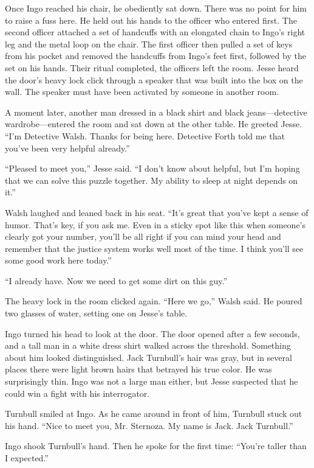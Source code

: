 \documentclass[12pt]{book}
\begin{document}
Once Ingo reached his chair, he obediently sat down.  There was no point for him to raise a fuss here.  He held out his hands to the officer who entered first.  The second officer attached a set of handcuffs with an elongated chain to Ingo's right leg and the metal loop on the chair.  The first officer then pulled a set of keys from his pocket and removed the handcuffs from Ingo's feet first, followed by the set on his hands.  Their ritual completed, the officers left the room.  Jesse heard the door's heavy lock click through a speaker that was built into the box on the wall.  The speaker must have been activated by someone in another room.

A moment later, another man dressed in a black shirt and black jeans---detective wardrobe---entered the room and sat down at the other table.  He greeted Jesse.  ``I'm Detective Walsh.  Thanks for being here.  Detective Forth told me that you've been very helpful already.''

``Pleased to meet you,'' Jesse said.  ``I don't know about helpful, but I'm hoping that we can solve this puzzle together.  My ability to sleep at night depends on it.''

Walsh laughed and leaned back in his seat.  ``It's great that you've kept a sense of humor.  That's key, if you ask me.  Even in a sticky spot like this when someone's clearly got your number, you'll be all right if you can mind your head and remember that the justice system works well most of the time.  I think you'll see some good work here today.''

``I already have.  Now we need to get some dirt on this guy.''

The heavy lock in the room clicked again.  ``Here we go,'' Walsh said.  He poured two glasses of water, setting one on Jesse's table.

Ingo turned his head to look at the door.  The door opened after a few seconds, and a tall man in a white dress shirt walked across the threshold.  Something about him looked distinguished.  Jack Turnbull's hair was gray, but in several places there were light brown hairs that betrayed his true color.  He was surprisingly thin.  Ingo was not a large man either, but Jesse suspected that he could win a fight with his interrogator.

Turnbull smiled at Ingo.  As he came around in front of him, Turnbull stuck out his hand.  ``Nice to meet you, Mr. Sternoza.  My name is Jack.  Jack Turnbull.''

Ingo shook Turnbull's hand.  Then he spoke for the first time: ``You're taller than I expected.''
\end{document}
